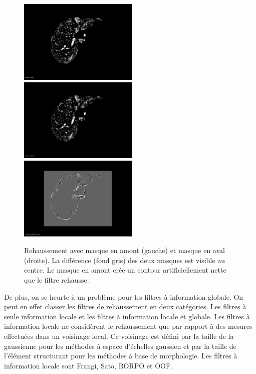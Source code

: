 \begin{figure}[!ht]
  \centering
  \includegraphics[height=4cm]{Images/output_maskedFirst.png}
  \includegraphics[height=4cm]{Images/output_unmasked.png}
  \includegraphics[height=4cm]{Images/output_masking_diff.png}
  \caption{Rehaussement avec masque en amont (gauche) et masque en aval (droite). La différence (fond gris) des deux masques est visible au centre. Le masque en amont crée un contour artificiellement nette que le filtre rehausse.}
  \label{fig:mask_intensity_profile}
\end{figure}

De plus, on se heurte à un problème pour les filtres à information globale. On peut en effet classer les filtres de rehaussement en deux catégories. Les filtres à seule information locale et les filtres à information locale et globale. Les filtres à information locale ne considèrent le rehaussement que par rapport à des mesures effectuées dans un voisinage local. Ce voisinage est défini par la taille de la gaussienne pour les méthodes à espace d'échelles gaussien et par la taille de l'élément structurant pour les méthodes à base de morphologie. Les filtres à information locale sont Frangi, Sato, RORPO et OOF.

